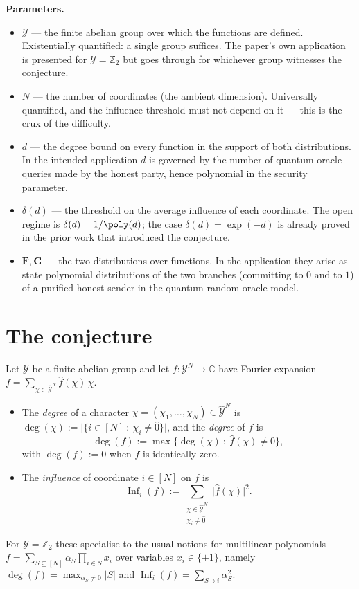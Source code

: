 \documentclass{conjura-conjecture}
\newcommand{\CC}{\mathbb{C}}
\newcommand{\ZZ}{\mathbb{Z}}
\newcommand{\cY}{\mathcal{Y}}
\newcommand{\dY}{\widehat{\mathcal{Y}}}
\newcommand{\bF}{\mathbf{F}}
\newcommand{\bG}{\mathbf{G}}
\begin{document}
\textbf{Parameters.}
\begin{itemize}
  \item $\cY$ --- the finite abelian group over which the functions are
  defined. Existentially quantified: a single group suffices. The paper's
  own application is presented for $\cY=\ZZ_2$ but goes through for
  whichever group witnesses the conjecture.
  \item $N$ --- the number of coordinates (the ambient dimension).
  Universally quantified, and the influence threshold must not depend on
  it --- this is the crux of the difficulty.
  \item $d$ --- the degree bound on every function in the support of both
  distributions. In the intended application $d$ is governed by the
  number of quantum oracle queries made by the honest party, hence
  polynomial in the security parameter.
  \item $\delta(d)$ --- the threshold on the average influence of each
  coordinate. The open regime is $\delta(d)=1/\poly(d)$; the case
  $\delta(d)=\exp(-d)$ is already proved in the prior work that
  introduced the conjecture.
  \item $\bF,\bG$ --- the two distributions over functions. In the
  application they arise as state polynomial distributions of the two
  branches (committing to $0$ and to $1$) of a purified honest sender in
  the quantum random oracle model.
\end{itemize}

\section{The conjecture}\label{sec:conjectures}

\begin{definition}
\label{def:deginf}
Let $\cY$ be a finite abelian group and let $f\colon\cY^N\to\CC$ have
Fourier expansion $f=\sum_{\chi\in\dY^N}\hat{f}(\chi)\,\chi$.
\begin{itemize}
  \item The \emph{degree} of a character
  $\chi=(\chi_1,\dots,\chi_N)\in\dY^N$ is
  $\deg(\chi):=\bigl\lvert\{i\in[N]\ :\ \chi_i\ne\hat{0}\}\bigr\rvert$,
  and the \emph{degree} of $f$ is
  \[ \deg(f):=\max\bigl\{\deg(\chi)\ :\ \hat{f}(\chi)\ne 0\bigr\}, \]
  with $\deg(f):=0$ when $f$ is identically zero.
  \item The \emph{influence} of coordinate $i\in[N]$ on $f$ is
  \[ \operatorname{Inf}_i(f):=
     \sum_{\substack{\chi\in\dY^N\\ \chi_i\ne\hat{0}}}
     \bigl\lvert\hat{f}(\chi)\bigr\rvert^{2}. \]
\end{itemize}
For $\cY=\ZZ_2$ these specialise to the usual notions for multilinear
polynomials $f=\sum_{S\subseteq[N]}\alpha_S\prod_{i\in S}x_i$ over
variables $x_i\in\{\pm 1\}$, namely
$\deg(f)=\max_{\alpha_S\ne 0}\lvert S\rvert$ and
$\operatorname{Inf}_i(f)=\sum_{S\ni i}\alpha_S^{2}$.
\end{definition}
\end{document}
